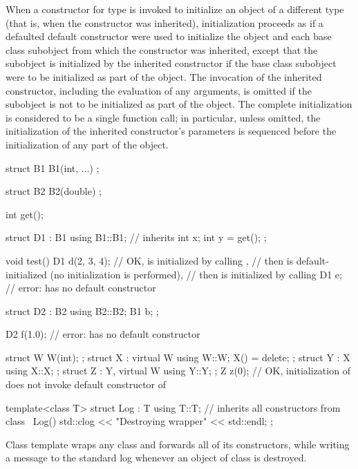 \pnum
When a constructor for type  is invoked
to initialize an object of a different type 
(that is, when the constructor was inherited),
initialization proceeds as if a defaulted default constructor
were used to initialize the  object and
each base class subobject from which the constructor was inherited,
except that the  subobject is initialized
by the inherited constructor
if the base class subobject were to be initialized
as part of the  object.
The invocation of the inherited constructor,
including the evaluation of any arguments,
is omitted if the  subobject is not to be initialized
as part of the  object.
The complete initialization is considered to be a single function call;
in particular, unless omitted,
the initialization of the inherited constructor's parameters
is sequenced before the initialization of any part of the  object.
\begin{example}
\begin{codeblock}
struct B1 {
  B1(int, ...) { }
};

struct B2 {
  B2(double) { }
};

int get();

struct D1 : B1 {
  using B1::B1;     // inherits 
  int x;
  int y = get();
};

void test() {
  D1 d(2, 3, 4);    // OK,  is initialized by calling ,
                    // then  is default-initialized (no initialization is performed),
                    // then  is initialized by calling 
  D1 e;             // error:  has no default constructor
}

struct D2 : B2 {
  using B2::B2;
  B1 b;
};

D2 f(1.0);          // error:  has no default constructor

struct W { W(int); };
struct X : virtual W { using W::W; X() = delete; };
struct Y : X { using X::X; };
struct Z : Y, virtual W { using Y::Y; };
Z z(0);             // OK, initialization of  does not invoke default constructor of 

template<class T> struct Log : T {
  using T::T;       // inherits all constructors from class 
  ~Log() { std::clog << "Destroying wrapper" << std::endl; }
};
\end{codeblock}
Class template  wraps any class and forwards all of its constructors,
while writing a message to the standard log
whenever an object of class  is destroyed.
\end{example}

